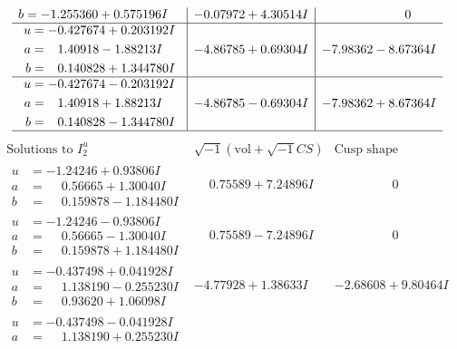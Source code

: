 \documentclass[1p]{elsarticle_modified}
\theoremstyle{definition}
\newcommand{\I}{\sqrt{-1}}
\begin{document}
$$\begin{array}{c|c|c}
\begin{aligned}
b &= -1.255360 + 0.575196 I\end{aligned}
 & -0.07972 + 4.30514 I & \phantom{-0.000000 } 0 \\ \hline\begin{aligned}
u &= -0.427674 + 0.203192 I \\
a &= \phantom{-}1.40918 - 1.88213 I \\
b &= \phantom{-}0.140828 + 1.344780 I\end{aligned}
 & -4.86785 + 0.69304 I & -7.98362 - 8.67364 I \\ \hline\begin{aligned}
u &= -0.427674 - 0.203192 I \\
a &= \phantom{-}1.40918 + 1.88213 I \\
b &= \phantom{-}0.140828 - 1.344780 I\end{aligned}
 & -4.86785 - 0.69304 I & -7.98362 + 8.67364 I\\
 \hline 
 \end{array}$$\newpage$$\begin{array}{c|c|c}  
\text{Solutions to }I^u_{2}& \I (\text{vol} + \sqrt{-1}CS) & \text{Cusp shape}\\
 \hline 
\begin{aligned}
u &= -1.24246 + 0.93806 I \\
a &= \phantom{-}0.56665 + 1.30040 I \\
b &= \phantom{-}0.159878 - 1.184480 I\end{aligned}
 & \phantom{-}0.75589 + 7.24896 I & \phantom{-0.000000 } 0 \\ \hline\begin{aligned}
u &= -1.24246 - 0.93806 I \\
a &= \phantom{-}0.56665 - 1.30040 I \\
b &= \phantom{-}0.159878 + 1.184480 I\end{aligned}
 & \phantom{-}0.75589 - 7.24896 I & \phantom{-0.000000 } 0 \\ \hline\begin{aligned}
u &= -0.437498 + 0.041928 I \\
a &= \phantom{-}1.138190 - 0.255230 I \\
b &= \phantom{-}0.93620 + 1.06098 I\end{aligned}
 & -4.77928 + 1.38633 I & -2.68608 + 9.80464 I \\ \hline\begin{aligned}
u &= -0.437498 - 0.041928 I \\
a &= \phantom{-}1.138190 + 0.255230 I \\

\end{aligned}
\end{array}$$
\end{document}
